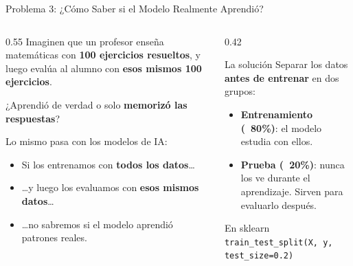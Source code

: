 \documentclass[aspectratio=169]{beamer}
\newcommand{\tech}[1]{\texttt{\textcolor{mainColor}{#1}}}
\begin{document}
\begin{frame}{Problema 3: ¿Cómo Saber si el Modelo Realmente Aprendió?}
  \begin{columns}[T]
    \begin{column}{0.55\textwidth}
      \small
      Imaginen que un profesor enseña matemáticas con \textbf{100 ejercicios resueltos}, y luego evalúa al alumno con \textbf{esos mismos 100 ejercicios}.

      \vspace{0.2cm}
      ¿Aprendió de verdad o solo \textbf{memorizó las respuestas}?

      \vspace{0.3cm}
      Lo mismo pasa con los modelos de IA:
      \vspace{0.1cm}
      \begin{itemize}\setlength\itemsep{3pt}
        \item Si los entrenamos con \textbf{todos los datos}\ldots
        \item \ldots y luego los evaluamos con \textbf{esos mismos datos}\ldots
        \item \ldots no sabremos si el modelo aprendió patrones reales.
      \end{itemize}
    \end{column}
    \begin{column}{0.42\textwidth}
      \begin{conceptbox}{\faCut\enspace La solución}
        \small
        Separar los datos \textbf{antes de entrenar} en dos grupos:
        \vspace{4pt}
        \begin{itemize}\setlength\itemsep{2pt}
          \item \textbf{Entrenamiento (~80\%)}: el modelo estudia con ellos.
          \item \textbf{Prueba (~20\%)}: nunca los ve durante el aprendizaje. Sirven para evaluarlo después.
        \end{itemize}
      \end{conceptbox}
      \vspace{0.1cm}
      \begin{alertblock}{\faPython\enspace En sklearn}
        \small\centering
        \tech{train\_test\_split(X, y, test\_size=0.2)}
      \end{alertblock}
    \end{column}
  \end{columns}
\end{frame}
\end{document}
